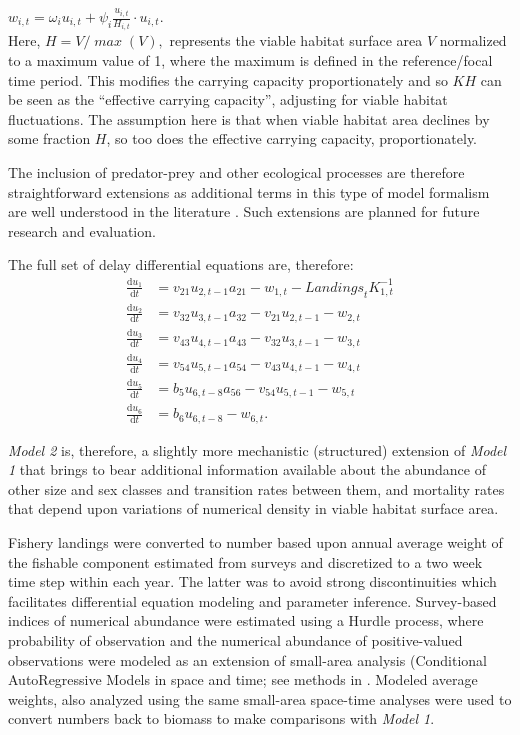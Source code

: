 \documentclass[
	letterpaper, %
	10pt, %
]{article}
\begin{document}
${w_{i,t}=\omega_{i}}{u_{i,t}+\psi_{i}}\frac{{u}_{i,t}}{H_{i,t}}\cdot{u}_{i,t}.$ \\

Here, ${H={V/\mathit{\max}}}{(V)},$ represents the viable habitat surface area 
$V{}$ normalized to a maximum value of 1, where the maximum is defined in
the reference/focal time period. This modifies the carrying capacity
proportionately and so  $\mathit{KH}$ can be seen as the ``effective carrying capacity'',
adjusting for viable habitat fluctuations. The assumption here is that when viable
habitat area declines by some fraction $H$, so too does the effective carrying capacity, proportionately.

The inclusion of predator-prey and other ecological processes are
therefore straightforward extensions as additional terms in this type
of model formalism are well understood in the literature \cite{Lotka_1920, Bertalanffy_1950, Pianka_1970, Wangersky_1978}. Such extensions are planned for future research and evaluation.

The full set of delay differential equations are, therefore:
\begin{align*} 
\frac{\mathrm{d} u_{1}}{\mathrm{d} t} &= v_{21}u_{2,{t-1}}a_{21}-w_{1,t}-\mathit{Landings}_{t}K_{1,t}^{-1} \\ 
\frac{\mathrm{d} u_{2}}{\mathrm{d} t} &= v_{32}u_{3,{t-1}}a_{32}-v_{21}u_{2,t-1}-w_{2,t} \\
\frac{\mathrm{d} u_{3}}{\mathrm{d} t} &= v_{43}u_{4,t-1}a_{43}-v_{32}u_{3,t-1}-w_{3,t} \\
\frac{\mathrm{d} u_{4}}{\mathrm{d} t} &= v_{54}u_{5,t-1}a_{54}-v_{43}u_{4,t-1}-w_{4,t} \\
\frac{\mathrm{d} u_{5}}{\mathrm{d} t} &= b_{5}u_{6,t-8}a_{56}-v_{54}u_{5,t-1}-w_{5,t} \\
\frac{\mathrm{d} u_{6}}{\mathrm{d} t} &= b_{6}u_{6,t-8}-w_{6,t}.
\end{align*}  


\emph{Model 2} is, therefore, a slightly more mechanistic (structured) extension of \emph{Model 1} that brings to bear additional information available about the abundance
of other size and sex classes and transition rates between them, and
mortality rates that depend upon variations of numerical density in viable habitat surface area. 

Fishery landings were converted to number based upon annual average
weight of the fishable component estimated from surveys and discretized
to a two week time step within each year. The latter was to avoid
strong discontinuities which facilitates differential equation modeling
and parameter inference. Survey-based indices of numerical abundance
were estimated using a Hurdle process, where probability of observation
and the numerical abundance of positive-valued observations were modeled
as an extension of small-area analysis (Conditional AutoRegressive
Models in space and time; see methods in \cite{Choi_et_al_2022, Choi_2022}.
Modeled average weights, also analyzed using the same small-area space-time
analyses were used to convert numbers back to biomass to make comparisons
with \emph{Model 1}.
\end{document}
